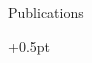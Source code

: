 \documentclass{resume}
\begin{document}

 \begin{rSection}{Publications}
   \begin{rSubsection}{}{}{}{}
     \itemsep +0.5pt %
   \item {}
   \end{rSubsection}
 \end{rSection}

\end{document}
